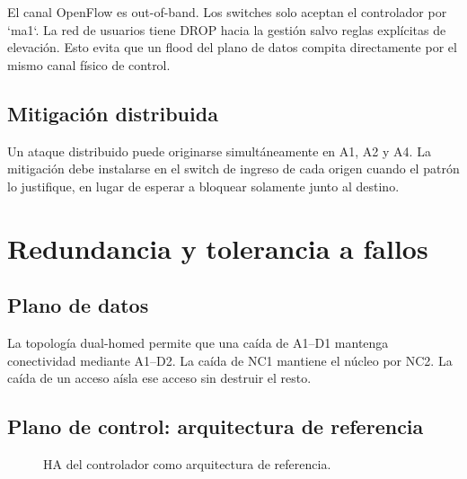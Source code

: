 \documentclass[11pt,a4paper]{article}
\begin{document}
El canal OpenFlow es out-of-band. Los switches solo aceptan el controlador por `ma1`. La red de usuarios tiene DROP hacia la gestión salvo reglas explícitas de elevación. Esto evita que un flood del plano de datos compita directamente por el mismo canal físico de control.

\subsection{Mitigación distribuida}

Un ataque distribuido puede originarse simultáneamente en A1, A2 y A4. La mitigación debe instalarse en el switch de ingreso de cada origen cuando el patrón lo justifique, en lugar de esperar a bloquear solamente junto al destino.

\section{Redundancia y tolerancia a fallos}

\subsection{Plano de datos}

La topología dual-homed permite que una caída de A1--D1 mantenga conectividad mediante A1--D2. La caída de NC1 mantiene el núcleo por NC2. La caída de un acceso aísla ese acceso sin destruir el resto.

\subsection{Plano de control: arquitectura de referencia}

\begin{figure}[H]
\centering
{}
\caption{HA del controlador como arquitectura de referencia.}
\end{figure}
\end{document}
